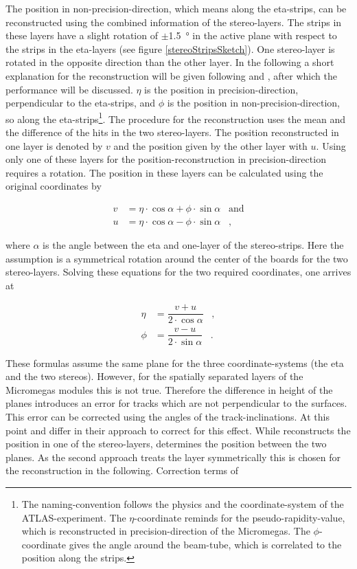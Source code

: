 \documentclass[
twoside,            %
BCOR1.4cm,          %
10pt,               %
headings=normal,    %
headsepline,        %
clearplainpage,		%
final,              %
div=14,
open=right,
bibliography=toc
]{scrreprt}
\begin{document}
The position in non-precision-direction, which means along the eta-strips, can be reconstructed using the combined information of the stereo-layers.
The strips in these layers have a slight rotation of $\pm$\SI{1.5}{\degree} in the active plane with respect to the strips in the eta-layers (see figure \ref{stereoStripsSketch}).
One stereo-layer is rotated in the opposite direction than the other layer.
In the following a short explanation for the reconstruction will be given following \cite{stereoMicromegas} and \cite{flierlThesis}, after which the performance will be discussed.
$\eta$ is the position in precision-direction, perpendicular to the eta-strips, and $\phi$ is the position in non-precision-direction, so along the eta-strips\footnote{
	The naming-convention follows the physics and the coordinate-system of the ATLAS-experiment.
	The $\eta$-coordinate reminds for the pseudo-rapidity-value, which is reconstructed in precision-direction of the Micromegas.
	The $\phi$-coordinate gives the angle around the beam-tube, which is correlated to the position along the strips.
}.
The procedure for the reconstruction uses the mean and the difference of the hits in the two stereo-layers.
The position reconstructed in one layer is denoted by $v$ and the position given by the other layer with $u$.
Using only one of these layers for the position-reconstruction in precision-direction requires a rotation.
The position in these layers can be calculated using the original coordinates by

\begin{align}
	v &= \eta \cdot \cos\!\alpha + \phi \cdot \sin\!\alpha \;\;\; \text{and}
	\\
	u &= \eta \cdot \cos\!\alpha - \phi \cdot \sin\!\alpha  \;\;\; ,
\end{align}

where $\alpha$ is the angle between the eta and one-layer of the stereo-strips.
Here the assumption is a symmetrical rotation around the center of the boards for the two stereo-layers.
Solving these equations for the two required coordinates, one arrives at

\begin{align}
	\eta &= \dfrac{v + u}{2 \cdot \cos\!\alpha} \;\;\; ,
	\\[10pt]
	\phi &= \dfrac{v - u}{2 \cdot \sin\!\alpha} \;\;\; .
	\label{stereoNonPrecision}
\end{align}

These formulas assume the same plane for the three coordinate-systems (the eta and the two stereos).
However, for the spatially separated layers of the Micromegas modules this is not true.
Therefore the difference in height of the planes introduces an error for tracks which are not perpendicular to the surfaces.
This error can be corrected using the angles of the track-inclinations.
At this point \cite{stereoMicromegas} and \cite{flierlThesis} differ in their approach to correct for this effect.
While \cite{stereoMicromegas} reconstructs the position in one of the stereo-layers, \cite{flierlThesis} determines the position between the two planes.
As the second approach treats the layer symmetrically this is chosen for the reconstruction in the following.
Correction terms of 
\end{document}
